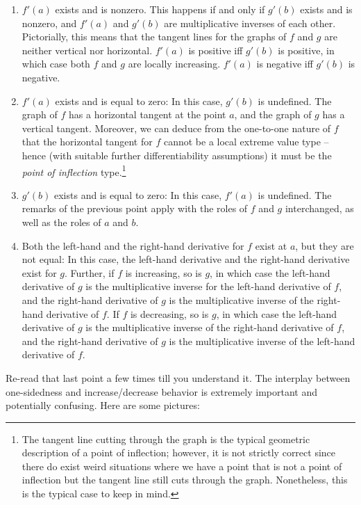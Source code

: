 \documentclass[10pt]{amsart}
\begin{document}
\begin{enumerate}
\item $f'(a)$ exists and is nonzero. This happens if and only if
  $g'(b)$ exists and is nonzero, and $f'(a)$ and $g'(b)$ are
  multiplicative inverses of each other. Pictorially, this means that
  the tangent lines for the graphs of $f$ and $g$ are neither vertical
  nor horizontal. $f'(a)$ is positive iff $g'(b)$ is positive, in
  which case both $f$ and $g$ are locally increasing. $f'(a)$ is
  negative iff $g'(b)$ is negative.
\item $f'(a)$ exists and is equal to zero: In this case, $g'(b)$ is
  undefined. The graph of $f$ has a horizontal tangent at the point
  $a$, and the graph of $g$ has a vertical tangent. Moreover, we can
  deduce from the one-to-one nature of $f$ that the horizontal tangent
  for $f$ cannot be a local extreme value type -- hence (with suitable
  further differentiability assumptions) it must be the {\em point of
  inflection} type.\footnote{The tangent line cutting through the
  graph is the typical geometric description of a point of inflection;
  however, it is not strictly correct since there do exist weird
  situations where we have a point that is not a point of inflection
  but the tangent line still cuts through the graph. Nonetheless, this
  is the typical case to keep in mind.}
\item $g'(b)$ exists and is equal to zero: In this case, $f'(a)$ is
  undefined. The remarks of the previous point apply with the roles of
  $f$ and $g$ interchanged, as well as the roles of $a$ and $b$.
\item Both the left-hand and the right-hand derivative for $f$ exist
  at $a$, but they are not equal: In this case, the left-hand
  derivative and the right-hand derivative exist for $g$. Further, if
  $f$ is increasing, so is $g$, in which case the left-hand derivative
  of $g$ is the multiplicative inverse for the left-hand derivative of
  $f$, and the right-hand derivative of $g$ is the multiplicative
  inverse of the right-hand derivative of $f$. If $f$ is decreasing,
  so is $g$, in which case the left-hand derivative of $g$ is the
  multiplicative inverse of the right-hand derivative of $f$, and the
  right-hand derivative of $g$ is the multiplicative inverse of the
  left-hand derivative of $f$.
\end{enumerate}

Re-read that last point a few times till you understand it. The
interplay between one-sidedness and increase/decrease behavior is
extremely important and potentially confusing. Here are some pictures:
\end{document}
